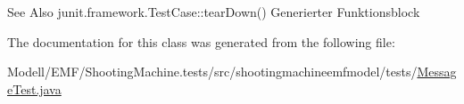 \begin{DoxySeeAlso}{See Also}
junit.\-framework.\-Test\-Case\-::tear\-Down() Generierter Funktionsblock 
\end{DoxySeeAlso}


The documentation for this class was generated from the following file\-:\begin{DoxyCompactItemize}
\item 
Modell/\-E\-M\-F/\-Shooting\-Machine.\-tests/src/shootingmachineemfmodel/tests/\hyperlink{_message_test_8java}{Message\-Test.\-java}\end{DoxyCompactItemize}
